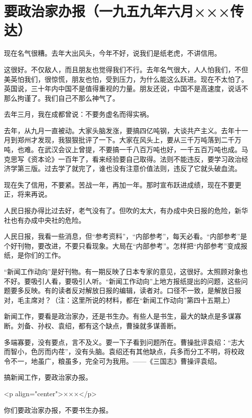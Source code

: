\section[要政治家办报（一九五九年六月×××传达）]{要政治家办报（一九五九年六月×××传达）}


现在名气很糟。去年大出风头，今年不好，说我们是纸老虎，不讲信用。

这很好。不仅敌人，而且朋友也觉得我们不行。去年名气很大，人人怕我们，不但美英怕我们，很惊慌，朋友也怕，受到压力，为什么能这么跃进。现在不太怕了。英国说，三十年内中国不是值得重视的力量。朋友还说，中国不是高速度，说话不那么拘谨了。我们自己不那么神气了。

去年三月，我在成都曾说：不要务虚名而得实祸。

去年，从九月一直被动。大家头脑发涨，要搞四亿吨钢，大谈共产主义。去年十一月到郑州才发现，我狠狠批评了一下。大家在风头上，要从三千万吨落到二千万吨，也难。在武汉会议上曾提，不要搞一千八百万吨也好，一千五百万吨也成。马克思写《资本论》一百年了，看来经验要自己取得。法则不能违反，要学习政治经济学第三版。过去学了就完了，谁也没有注意价值法则，违反了它就头破血流。

现在失了信用，不要紧。苦战一年，再加一年。那时宣布跃进成绩，现在不要更正，将来再说。

人民日报办得比过去好，老气没有了。但吹的太大，有办成中央日报的危险，新华社也有办成中央社的危险。

人民日报，我看一些消息，但“参考资料”，“内部参考”，每天必看。“内部参考”是个好刊物，要改进，不要只看现象。大局在“内部参考”。怎样把“内部参考”变成报纸，是你们的工作。

“新闻工作动向”是好刊物。有一期反映了日本专家的意见，这很好。太照顾对象也不好。要吸引人看，要吸引人听。“新闻工作动向”上地方报纸提出的问题，这些问题要多反映。有的读者反对解放日报的编辑，读者对。口径不一致，是解放日报对，毛主席对？（注：这里所说的材料，都在“新闻工作动向”第四十五期上）

新闻工作，要看是政治家办，还是书生办。有些人是书生，最大的缺点是多谋寡断。刘备、孙权、袁绍，都有这个缺点，曹操就多谋善断。

多端寡要，没有要点，言不及义。要一下子看到问题所在。曹操批评袁绍：“志大而智小，色厉而内荏”，没有头脑。袁绍还有其他缺点，兵多而分工不明，将校政令不一，地虽广，粮虽多，完全可为我用。——《三国志》曹操评袁绍。

搞新闻工作，要政治家办报。

<p align="center">×××</p>

你们要政治家办报，不要书生办报。


